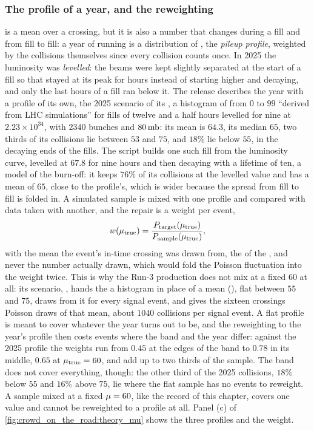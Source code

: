 \subsubsection{The profile of a year, and the reweighting}
\label{sec:crowd_on_the_road:profile}
\mup is a mean over a crossing, but it is also a number that changes
during a fill and from fill to fill: a year of running is a distribution
of \mup, the \emph{pileup profile}, weighted by the collisions themselves
since every collision counts once. In 2025 the luminosity was
\emph{levelled}: the beams were kept slightly separated at the start of a
fill so that \mup stayed at its peak for hours instead of starting higher
and decaying, and only the last hours of a fill ran below it. The release
describes the year with a profile of its own, the 2025 scenario of its
, a histogram of \mutrue from $0$ to $99$ ``derived from
LHC simulations'' for fills of twelve and a half hours levelled for nine
at $2.23\times10^{34}$, with $2340$ bunches and $80\,\mathrm{mb}$: its mean is
$64.3$, its median $65$, two thirds of its collisions lie between $53$
and $75$, and $18\%$ lie below $55$, in the decaying ends of the fills.
The script builds one such fill from the luminosity curve, levelled at
$67.8$ for nine hours and then decaying with a lifetime of ten, a model of
the burn-off: it keeps $76\%$ of its collisions at the levelled value and
has a mean of $65$, close to the profile's, which is wider because the
spread from fill to fill is folded in. A simulated sample is mixed with one
profile and compared with data taken with another, and the repair is a
weight per event,
\begin{equation}
  w(\mu_{\mathrm{true}})=\frac{P_{\mathrm{target}}(\mu_{\mathrm{true}})}{P_{\mathrm{sample}}(\mu_{\mathrm{true}})},
  \label{eq:crowd_on_the_road:reweight}
\end{equation}
with \mutrue the mean the event's in-time crossing was drawn from, the
 of the , and never
the number actually drawn, which would fold the Poisson fluctuation into
the weight twice. This is why the Run-3 production does not mix at a
fixed $60$ at all: its scenario, ,
hands the \Mix a histogram in place of a mean (),
flat between $55$ and $75$, draws \mutrue from it for every signal event,
and gives the sixteen crossings Poisson draws of that mean, about $1040$
collisions per signal event. A flat profile is meant to cover whatever
the year turns out to be, and the reweighting to the year's profile then
costs events where the band and the year differ: against the 2025 profile
the weights run from $0.45$ at the edges of the band to $0.78$ in its
middle, $0.65$ at $\mu_{\mathrm{true}}=60$, and add up to two thirds of the sample.
The band does not cover everything, though: the other third of the 2025
collisions, $18\%$ below $55$ and $16\%$ above $75$, lie where the flat
sample has no events to reweight. A sample mixed at a fixed $\mu=60$, like the record of
this chapter, covers one value and cannot be reweighted to a profile at
all. Panel (c) of \cref{fig:crowd_on_the_road:theory_mu} shows the three
profiles and the weight.

